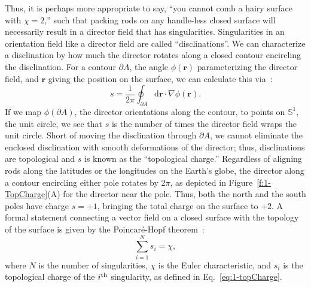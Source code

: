 Thus, it is perhaps more appropriate to say, ``you cannot comb a hairy surface with $\chi=2$,'' such that packing rods on any handle-less closed surface will necessarily result in a director field that has singularities.
Singularities in an orientation field like a director field are called ``disclinations''.
We can characterize a disclination by how much the director rotates along a closed contour encircling the disclination.
For a contour $\partial A$, the angle $\phi(\mathbf{r})$ parameterizing the director field, and $\mathbf{r}$ giving the position on the surface, we can calculate this via~\cite{RN23,RN153,RN203}:
\begin{equation}
  s = \frac{1}{2 \pi}\oint_{\partial A} \textrm{d}\mathbf{r} \cdot \nabla\phi(\mathbf{r}).\label{eq:1-topCharge}
\end{equation}
If we map $\phi(\partial A)$, the director orientations along the contour, to points on $\mathbb{S}^1$, the unit circle, we see that $s$ is the number of times the director field wraps the unit circle.
Short of moving the disclination through $\partial A$, we cannot eliminate the enclosed disclination with smooth deformations of the director; thus, disclinations are topological and $s$ is known as the ``topological charge.''
Regardless of aligning rods along the latitudes or the longitudes on the Earth's globe, the director along a contour encircling either pole rotates by $2 \pi$, as depicted in Figure~\ref{f:1-TopCharge}(A) for the director near the pole.
Thus, both the north and the south poles have charge $s = +1$, bringing the total charge on the surface to $+2$.
A formal statement connecting a vector field on a closed surface with the topology of the surface is given by the Poincar\'e-Hopf theorem~\cite{RN23}:
\begin{equation}
  \sum\limits_{i = 1}^{N} s_i = \chi,\label{e:1-PH}
\end{equation}
where $N$ is the number of singularities, $\chi$ is the Euler characteristic, and $s_i$ is the topological charge of the $i^{\rm th}$ singularity, as defined in Eq.~\ref{eq:1-topCharge}.

